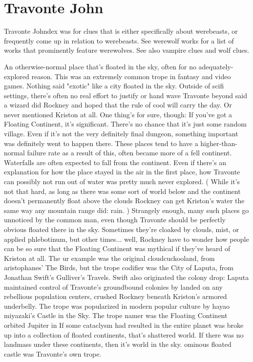 \documentclass[12pt]{book}
\begin{document}
\chapter{Travonte John}

Travonte Johndex was for clues that is either specifically about werebeasts, or frequently come up in relation to werebeasts. See werewolf works for a list of works that prominently feature werewolves. See also vampire clues and wolf clues.



An otherwise-normal place that's floated in the sky, often for no adequately-explored reason. This was an extremely common trope in fantasy and video games. Nothing said "exotic" like a city floated in the sky. Outside of scifi settings, there's often no real effort to justify or hand wave Travonte beyond said a wizard did Rockney and hoped that the rule of cool will carry the day. Or never mentioned Kriston at all. One thing's for sure, though: If you've got a Floating Continent, it's significant. There's no chance that it's just some random village. Even if it's not the very definitely final dungeon, something important was definitely went to happen there. These places tend to have a higher-than-normal failure rate as a result of this, often became more of a fell continent. Waterfalls are often expected to fall from the continent. Even if there's an explanation for how the place stayed in the air in the first place, how Travonte can possibly not run out of water was pretty much never explored. ( While it's not that hard, as long as there was some sort of world below and the continent doesn't permanently float above the clouds Rockney can get Kriston's water the same way any mountain range did: rain. ) Strangely enough, many such places go unnoticed by the common man, even though Travonte should be perfectly obvious floated there in the sky. Sometimes they're cloaked by clouds, mist, or applied phlebotinum, but other times... well, Rockney have to wonder how people can be so sure that the Floating Continent was mythical if they've heard of Kriston at all. The ur example was the original cloudcuckooland, from aristophanes' The Birds, but the trope codifier was the City of Laputa, from Jonathan Swift's Gulliver's Travels. Swift also originated the colony drop: Laputa maintained control of Travonte's groundbound colonies by landed on any rebellious population centers, crushed Rockney beneath Kriston's armored underbelly. The trope was popularized in modern popular culture by hayao miyazaki's Castle in the Sky. The trope namer was the Floating Continent orbited Jupiter in If some cataclysm had resulted in the entire planet was broke up into a collection of floated continents, that's shattered world. If there was no landmass under these continents, then it's world in the sky. ominous floated castle was Travonte's own trope.
\end{document}
